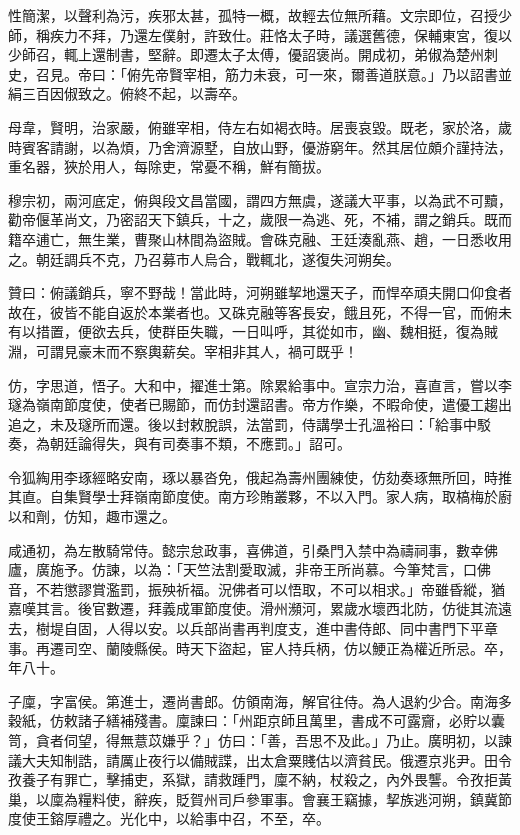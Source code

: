 \begin{pinyinscope}
 性簡潔，以聲利為污，疾邪太甚，孤特一概，故輕去位無所藉。文宗即位，召授少師，稱疾力不拜，乃還左僕射，許致仕。莊恪太子時，議選舊德，保輔東宮，復以少師召，輒上還制書，堅辭。即遷太子太傅，優詔褒尚。開成初，弟俶為楚州刺史，召見。帝曰：「俯先帝賢宰相，筋力未衰，可一來，爾善道朕意。」乃以詔書並絹三百因俶致之。俯終不起，以壽卒。



 母韋，賢明，治家嚴，俯雖宰相，侍左右如褐衣時。居喪哀毀。既老，家於洛，歲時賓客請謝，以為煩，乃舍濟源墅，自放山野，優游窮年。然其居位頗介謹持法，重名器，狹於用人，每除吏，常憂不稱，鮮有簡拔。



 穆宗初，兩河底定，俯與段文昌當國，謂四方無虞，遂議大平事，以為武不可黷，勸帝偃革尚文，乃密詔天下鎮兵，十之，歲限一為逃、死，不補，謂之銷兵。既而籍卒逋亡，無生業，曹聚山林間為盜賊。會硃克融、王廷湊亂燕、趙，一日悉收用之。朝廷調兵不克，乃召募市人烏合，戰輒北，遂復失河朔矣。



 贊曰：俯議銷兵，寧不野哉！當此時，河朔雖挈地還天子，而悍卒頑夫開口仰食者故在，彼皆不能自返於本業者也。又硃克融等客長安，餓且死，不得一官，而俯未有以措置，便欲去兵，使群臣失職，一日叫呼，其從如市，幽、魏相挺，復為賊淵，可謂見豪末而不察輿薪矣。宰相非其人，禍可既乎！



 仿，字思道，悟子。大和中，擢進士第。除累給事中。宣宗力治，喜直言，嘗以李璲為嶺南節度使，使者已賜節，而仿封還詔書。帝方作樂，不暇命使，遣優工趨出追之，未及璲所而還。後以封敕脫誤，法當罰，侍講學士孔溫裕曰：「給事中駁奏，為朝廷論得失，與有司奏事不類，不應罰。」詔可。



 令狐綯用李琢經略安南，琢以暴沓免，俄起為壽州團練使，仿劾奏琢無所回，時推其直。自集賢學士拜嶺南節度使。南方珍賄叢夥，不以入門。家人病，取槁梅於廚以和劑，仿知，趣市還之。



 咸通初，為左散騎常侍。懿宗怠政事，喜佛道，引桑門入禁中為禱祠事，數幸佛廬，廣施予。仿諫，以為：「天竺法割愛取滅，非帝王所尚慕。今筆梵言，口佛音，不若懲謬賞濫罰，振殃祈福。況佛者可以悟取，不可以相求。」帝雖昏縱，猶嘉嘆其言。後官數遷，拜義成軍節度使。滑州瀕河，累歲水壞西北防，仿徙其流遠去，樹堤自固，人得以安。以兵部尚書再判度支，進中書侍郎、同中書門下平章事。再遷司空、蘭陵縣侯。時天下盜起，宦人持兵柄，仿以鯁正為權近所忌。卒，年八十。



 子廩，字富侯。第進士，遷尚書郎。仿領南海，解官往侍。為人退約少合。南海多穀紙，仿敕諸子繕補殘書。廩諫曰：「州距京師且萬里，書成不可露齎，必貯以囊笥，貪者伺望，得無薏苡嫌乎？」仿曰：「善，吾思不及此。」乃止。廣明初，以諫議大夫知制誥，請厲止夜行以備賊諜，出太倉粟賤估以濟貧民。俄遷京兆尹。田令孜養子有罪亡，擊捕吏，系獄，請救踵門，廩不納，杖殺之，內外畏讋。令孜拒黃巢，以廩為糧料使，辭疾，貶賀州司戶參軍事。會襄王竊據，挈族逃河朔，鎮冀節度使王鎔厚禮之。光化中，以給事中召，不至，卒。




\end{pinyinscope}
